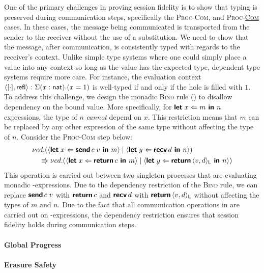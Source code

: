 One of the primary challenges in proving session fidelity is to show that typing
is preserved during communication steps, specifically the \textsc{Proc-Com}, and
\textsc{Proc-\underline{Com}} cases. In these cases, the message being
communicated is transported from the sender to the receiver without the use of a
substitution. We need to show that the message, after communication, is
consistently typed with regards to the receiver's context. Unlike simple type
systems where one could simply place a value into any context so long as
the value has the expected type, dependent type systems require more care. For
instance, the evaluation context $\langle{{[\cdot]},{\textsf{refl}}}\rangle_{} : \Sigma(x : \textsf{nat}).(x = 1)$ 
is well-typed if and only if the hole is filled with $1$. To address this challenge, 
we design the monadic \textsc{Bind} rule ()
to disallow dependency on the bound value. More specifically, for
$\textbf{\textsf{let}}\;{x}\Leftarrow{m}\textbf{\textsf{ in }}{n}$ expressions, the type of $n$ \emph{cannot} depend on $x$. This
restriction means that $m$ can be replaced by any other expression of the same
type without affecting the type of $n$. Consider the \textsc{Proc-Com} step below:
\begin{align*}
  &{\nu{cd}.{({\langle{\textbf{\textsf{let}}\;{x}\Leftarrow{{\textbf{\textsf{send}}\,{c}}\;{v}}\textbf{\textsf{ in }}{m}}\rangle} \mid {\langle{\textbf{\textsf{let}}\;{y}\Leftarrow{\textbf{\textsf{recv}}\,{d}}\textbf{\textsf{ in }}{n}}\rangle})}} \\
  &\quad\Rrightarrow {\nu{cd}.{({\langle{\textbf{\textsf{let}}\;{x}\Leftarrow{\textbf{\textsf{return}}\,{c}}\textbf{\textsf{ in }}{m}}\rangle} \mid {\langle{\textbf{\textsf{let}}\;{y}\Leftarrow{\textbf{\textsf{return}}\,{\langle{{v},{d}}\rangle_{\textsf{L}}}}\textbf{\textsf{ in }}{n}}\rangle})}}
\end{align*}
This operation is carried out between two singleton processes that are
evaluating monadic -expressions. Due to the dependency restriction of
the \textsc{Bind} rule, we can replace ${\textbf{\textsf{send}}\,{c}}\;{v}$ with $\textbf{\textsf{return}}\,{c}$
and $\textbf{\textsf{recv}}\,{d}$ with $\textbf{\textsf{return}}\,{\langle{{v},{d}}\rangle_{\textsf{L}}}$ without affecting the types of
$m$ and $n$. Due to the fact that all communication operations in \TLLC{} are
carried out on -expressions, the dependency restriction ensures that
session fidelity holds during communication steps.

\paragraph{\textbf{Global Progress}}


\paragraph{\textbf{Erasure Safety}}